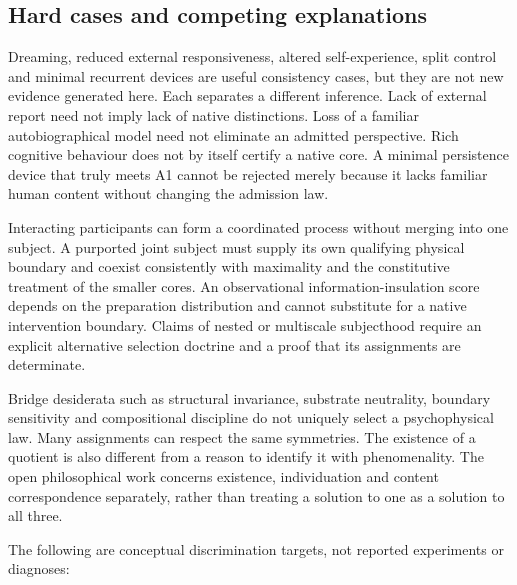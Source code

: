\documentclass[
  11pt,
  a4paper,
]{article}
\begin{document}
\subsection{Hard cases and competing
explanations}\label{hard-cases-and-competing-explanations}

Dreaming, reduced external responsiveness, altered self-experience,
split control and minimal recurrent devices are useful consistency
cases, but they are not new evidence generated here. Each separates a
different inference. Lack of external report need not imply lack of
native distinctions. Loss of a familiar autobiographical model need not
eliminate an admitted perspective. Rich cognitive behaviour does not by
itself certify a native core. A minimal persistence device that truly
meets A1 cannot be rejected merely because it lacks familiar human
content without changing the admission law.

Interacting participants can form a coordinated process without merging
into one subject. A purported joint subject must supply its own
qualifying physical boundary and coexist consistently with maximality
and the constitutive treatment of the smaller cores. An observational
information-insulation score depends on the preparation distribution and
cannot substitute for a native intervention boundary. Claims of nested
or multiscale subjecthood require an explicit alternative selection
doctrine and a proof that its assignments are determinate.

Bridge desiderata such as structural invariance, substrate neutrality,
boundary sensitivity and compositional discipline do not uniquely select
a psychophysical law. Many assignments can respect the same symmetries.
The existence of a quotient is also different from a reason to identify
it with phenomenality. The open philosophical work concerns existence,
individuation and content correspondence separately, rather than
treating a solution to one as a solution to all three.

The following are conceptual discrimination targets, not reported
experiments or diagnoses:
\end{document}

